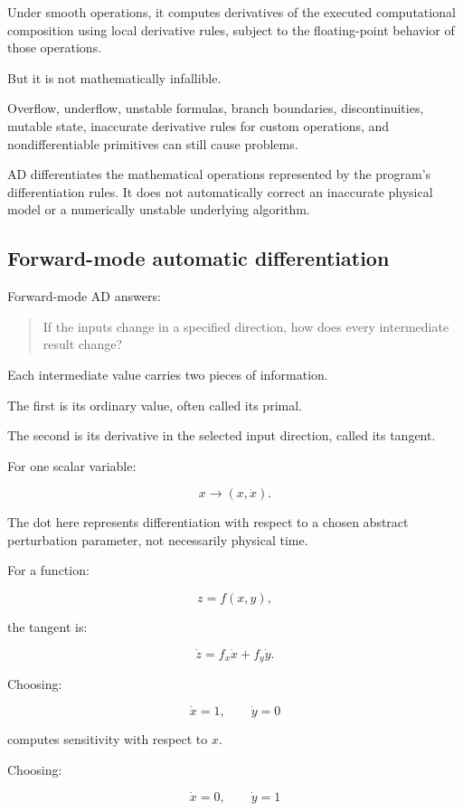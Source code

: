 Under smooth operations, it computes derivatives of the executed computational composition using local derivative rules, subject to the floating-point behavior of those operations.

But it is not mathematically infallible.

Overflow, underflow, unstable formulas, branch boundaries, discontinuities, mutable state, inaccurate derivative rules for custom operations, and nondifferentiable primitives can still cause problems.

AD differentiates the mathematical operations represented by the program's differentiation rules. It does not automatically correct an inaccurate physical model or a numerically unstable underlying algorithm.

\subsection{Forward-mode automatic differentiation}\label{02-foundations-ii-ch022-forward-mode-automatic-differentiation}

Forward-mode AD answers:

\begin{quote}
If the inputs change in a specified direction, how does every intermediate result change?
\end{quote}

Each intermediate value carries two pieces of information.

The first is its ordinary value, often called its primal.

The second is its derivative in the selected input direction, called its tangent.

For one scalar variable:

\[
x\longrightarrow(x,\dot x).
\]

The dot here represents differentiation with respect to a chosen abstract perturbation parameter, not necessarily physical time.

For a function:

\[
z=f(x,y),
\]

the tangent is:

\[
\dot z=f_x\dot x+f_y\dot y.
\]

Choosing:

\[
\dot x=1,\qquad \dot y=0
\]

computes sensitivity with respect to \(x\).

Choosing:

\[
\dot x=0,\qquad \dot y=1
\]

